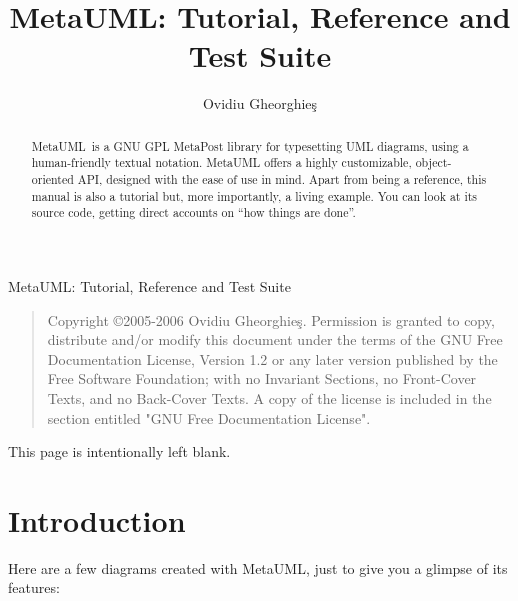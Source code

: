 \documentclass{article}
\newcommand{\metauml}{MetaUML}
\begin{document}
\metauml: Tutorial, Reference and Test Suite

\begin{quote}
    Copyright \copyright 2005-2006 Ovidiu Gheorghie\c{s}.
    Permission is granted to copy, distribute and/or modify this document
    under the terms of the GNU Free Documentation License, Version 1.2
    or any later version published by the Free Software Foundation;
    with no Invariant Sections, no Front-Cover Texts, and no Back-Cover Texts.
    A copy of the license is included in the section entitled "GNU
    Free Documentation License".
\end{quote}

\pagebreak
This page is intentionally left blank.

\pagebreak
\title{\metauml: Tutorial, Reference and Test Suite}

\author{Ovidiu Gheorghie\c{s}}

\maketitle

\begin{abstract}
\metauml\ is a GNU GPL MetaPost library for typesetting UML diagrams, using a human-friendly textual notation. MetaUML offers a highly customizable, object-oriented API, designed with the ease of use in mind. Apart from being a reference, this manual is also a tutorial but, more importantly, a living example. You can look at its source code, getting direct accounts on ``how things are done''.
\end{abstract}


\section{Introduction}

Here are a few diagrams created with MetaUML, just to give you a glimpse of its features:
\end{document}
